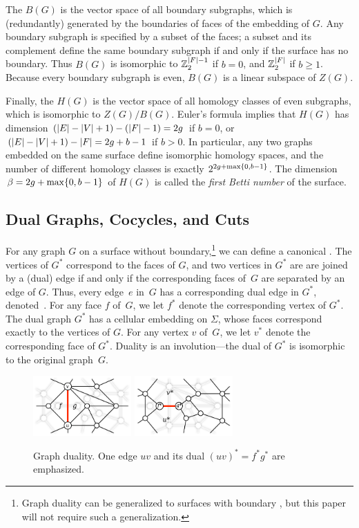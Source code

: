 \documentclass{sig-alternate}
\def\Z{\mathbb{Z}}
\begin{document}
The  $B(G)$ is the vector space of all boundary subgraphs, which is (redundantly) generated by the boundaries of faces of the embedding of $G$.  Any boundary subgraph is specified by a subset of the faces; a subset and its complement define the same boundary subgraph if and only if the surface has no boundary.  Thus $B(G)$ is isomorphic to $\Z_2^{\abs{F}-1}$ if $b=0$, and $\Z_2^{\abs{F}}$ if $b\ge 1$.   Because every boundary subgraph is even, $B(G)$ is a linear subspace of $Z(G)$. 

Finally, the  $H(G)$ is the vector space of all homology classes of even subgraphs, which is isomorphic to $Z(G)/B(G)$.  Euler's formula implies that $H(G)$ has dimension $(\mathopen| E \mathclose|-\mathopen| V \mathclose|+1)-(\mathopen| F \mathclose|-1) = 2g$ if $b=0$, or $(\mathopen| E \mathclose|-\mathopen| V \mathclose|+1)-\mathopen| F \mathclose| = 2g+b-1$ if $b>0$.  In particular, any two graphs embedded on the same surface define isomorphic homology spaces, and the number of different homology classes is exactly $2^{2g+\max\{ 0, b-1 \}}$.  The dimension $\beta = 2g+\max\{ 0, b-1 \}$ of $H(G)$ is called the \emph{first Betti number} of the surface.

\subsection{Dual Graphs, Cocycles, and Cuts}

For any graph $G$ on a surface without boundary,\footnote{Graph duality can be generalized to surfaces with boundary \cite{ce-tspcs-06, ew-csec-08}, but this paper will not require such a generalization.} we can define a canonical .  The vertices of $G^*$ correspond to the faces of $G$, and two vertices in $G^*$ are are joined by a (dual) edge if and only if the corresponding faces of~$G$ are separated by an edge of $G$.  Thus, every edge~$e$ in~$G$ has a corresponding dual edge in $G^*$, denoted~.  For any face $f$ of~$G$, we let $f^*$ denote the corresponding vertex of $G^*$.  The dual graph $G^*$ has a cellular embedding on $\Sigma$, whose faces correspond exactly to the vertices of $G$.  For any vertex $v$ of~$G$, we let $v^*$ denote the corresponding face of $G^*$.  Duality is an involution---the dual of $G^*$ is isomorphic to the original graph~$G$.

\begin{figure}[htb]
\centering
\includegraphics[height=0.9in]{Fig/primal}\quad
\includegraphics[height=0.9in]{Fig/dual}
\caption{Graph duality.  One edge $uv$ and its dual $(uv)^* =
f^*g^*$ are emphasized.} \label{F:primaldual}
\end{figure}
\end{document}
